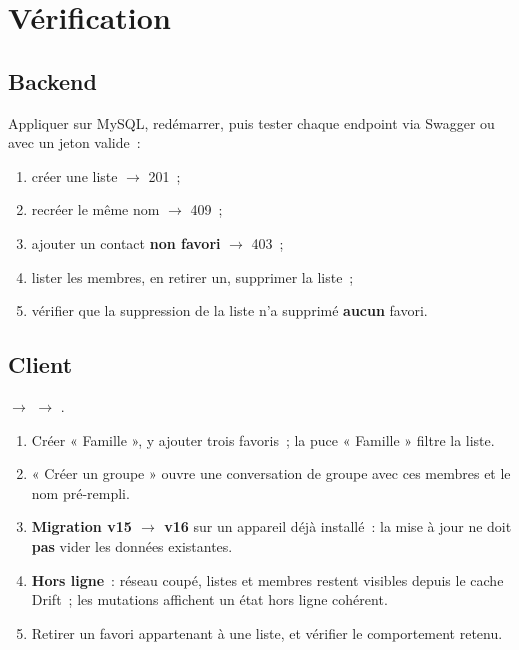 \chapter{Vérification}

\section{Backend}

Appliquer  sur MySQL, redémarrer, puis tester chaque endpoint
via Swagger ou  avec un jeton valide~:

\begin{enumerate}[leftmargin=1.6em]
  \item créer une liste $\rightarrow$ 201~;
  \item recréer le même nom $\rightarrow$ 409~;
  \item ajouter un contact \textbf{non favori} $\rightarrow$ 403~;
  \item lister les membres, en retirer un, supprimer la liste~;
  \item vérifier que la suppression de la liste n'a supprimé \textbf{aucun} favori.
\end{enumerate}

\section{Client}

 $\rightarrow$
 $\rightarrow$
.

\begin{enumerate}[leftmargin=1.6em]
  \item Créer « Famille », y ajouter trois favoris~; la puce « Famille » filtre la liste.
  \item « Créer un groupe » ouvre une conversation de groupe avec ces membres et le nom
        pré-rempli.
  \item \textbf{Migration v15 $\rightarrow$ v16} sur un appareil déjà installé~: la mise à
        jour ne doit \textbf{pas} vider les données existantes.
  \item \textbf{Hors ligne}~: réseau coupé, listes et membres restent visibles depuis le
        cache Drift~; les mutations affichent un état hors ligne cohérent.
  \item Retirer un favori appartenant à une liste, et vérifier le comportement retenu.
\end{enumerate}

